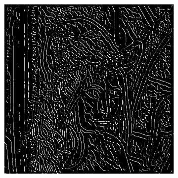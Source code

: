 \documentclass[a4paper]{article}
\begin{document}
\begin{figure}[h]
\begin{subfigure}{0.33\textwidth}
\end{subfigure}
\begin{subfigure}{0.33\textwidth}
\includegraphics[width=\textwidth]{img/sigma3/lenanon.png}
\end{subfigure}


\end{figure}
\end{document}
